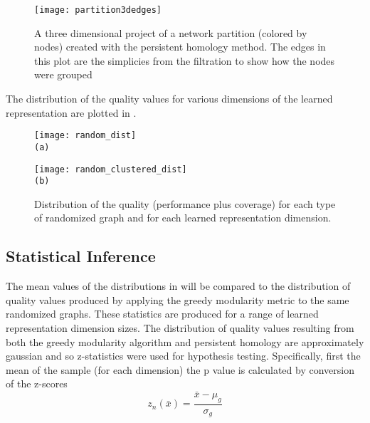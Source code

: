 \documentclass[letter,10pt,openany]{article}
\begin{document}
\begin{figure}[H]
\begin{minipage}[height=1.0\textheight]{1.0\textwidth}
\centering
\texttt{[image: partition3dedges]}
\end{minipage}
\caption{\label{deepwalk_2d_single}
A three dimensional project of a network partition (colored by nodes) created
with the persistent homology method. The edges in this plot are the simplicies from the
filtration to show how the nodes were grouped
}
\end{figure}

The distribution of the quality values for various dimensions of the learned representation are plotted
in .
\begin{figure}[H]
\begin{minipage}[height=.5\textheight]{.5\textwidth}
\centering
\texttt{[image: random\_dist]}
\\ \small{\texttt{(a)}}
\end{minipage}
\begin{minipage}[height=.5\textheight]{.5\textwidth}
\centering
\texttt{[image: random\_clustered\_dist]}
\\ \small{\texttt{(b)}}
\end{minipage}
\caption{\label{quality}
Distribution of the quality (performance plus coverage) for each
type of randomized graph and for each learned representation dimension.
}
\end{figure}

\subsection{Statistical Inference}
The mean values of the distributions in  will be compared to the
distribution of quality values produced by
applying the greedy modularity metric to the same randomized graphs. These statistics
are produced for a range of learned representation dimension sizes.
The distribution of quality values resulting from both the greedy modularity algorithm
and persistent homology are approximately gaussian and so z-statistics were used for hypothesis testing.
Specifically, first the mean of the sample (for each dimension) the p value is calculated
by conversion of the z-scores
\begin{equation}
z_n(\bar{x}) = \frac{\bar{x} - \mu_g}{\sigma_g}
\end{equation}
\end{document}
